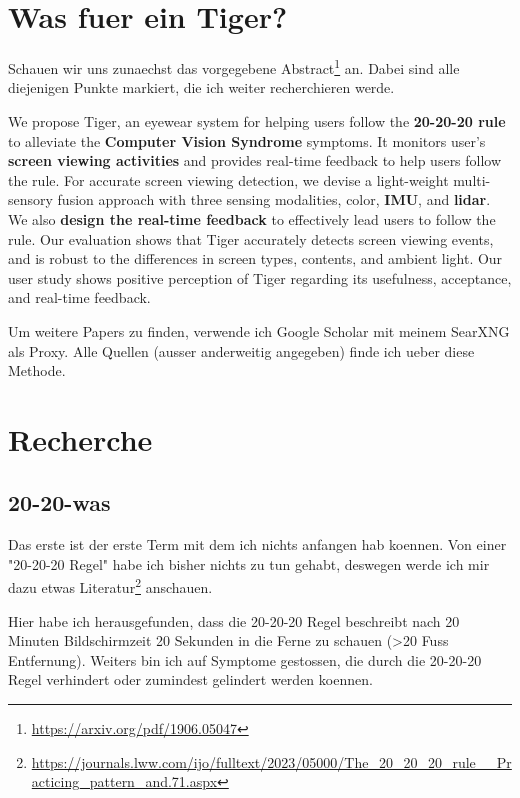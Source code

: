 
\section{Was fuer ein Tiger?}

Schauen wir uns zunaechst das vorgegebene Abstract\footnote{\url{https://arxiv.org/pdf/1906.05047}}
an. Dabei sind alle diejenigen Punkte markiert, die ich weiter recherchieren werde.

We propose Tiger, an eyewear system for helping users follow the \textbf{20-20-20 rule} to alleviate the \textbf{Computer Vision Syndrome} symptoms. It monitors user’s \textbf{screen viewing activities} and provides real-time feedback to help users follow the rule. For accurate screen viewing detection, we devise a light-weight multi-sensory fusion approach with three sensing modalities, color, \textbf{IMU}, and \textbf{lidar}. We also \textbf{design the real-time feedback} to effectively lead users to follow the rule. Our evaluation shows that Tiger accurately detects screen viewing events, and is robust to the differences in screen types, contents, and ambient light. Our user study shows positive perception of Tiger regarding its usefulness, acceptance, and real-time feedback.

Um weitere Papers zu finden, verwende ich Google Scholar mit meinem SearXNG als Proxy. Alle Quellen (ausser anderweitig angegeben) finde ich ueber diese Methode.

\section{Recherche}

\subsection{20-20-was}

Das erste ist der erste Term mit dem ich nichts anfangen hab koennen. Von einer "20-20-20 Regel" habe ich bisher nichts zu tun gehabt, deswegen werde 
ich mir dazu etwas Literatur\footnote{\url{https://journals.lww.com/ijo/fulltext/2023/05000/The_20_20_20_rule__Practicing_pattern_and.71.aspx}} anschauen.

Hier habe ich herausgefunden, dass die 20-20-20 Regel beschreibt nach 20 Minuten Bildschirmzeit 20 Sekunden in die Ferne zu schauen (>20 Fuss Entfernung). 
Weiters bin ich auf Symptome gestossen, die durch die 20-20-20 Regel verhindert oder zumindest gelindert werden koennen.

